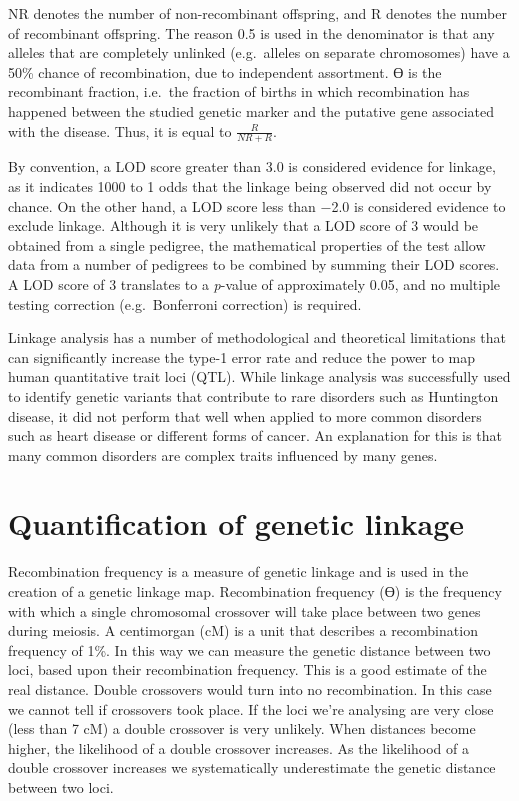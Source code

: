 NR denotes the number of non-recombinant offspring, and R denotes the number of recombinant offspring. The reason 0.5 is used in the denominator is that any alleles that are completely unlinked (e.g.~alleles on separate chromosomes) have a 50\% chance of recombination, due to independent assortment. ϴ is the recombinant fraction, i.e.~the fraction of births in which recombination has happened between the studied genetic marker and the putative gene associated with the disease. Thus, it is equal to \(\frac{R}{NR+R}\).

By convention, a LOD score greater than 3.0 is considered evidence for linkage, as it indicates 1000 to 1 odds that the linkage being observed did not occur by chance. On the other hand, a LOD score less than −2.0 is considered evidence to exclude linkage. Although it is very unlikely that a LOD score of 3 would be obtained from a single pedigree, the mathematical properties of the test allow data from a number of pedigrees to be combined by summing their LOD scores. A LOD score of 3 translates to a \emph{p}-value of approximately 0.05, and no multiple testing correction (e.g.~Bonferroni correction) is required.

Linkage analysis has a number of methodological and theoretical limitations that can significantly increase the type-1 error rate and reduce the power to map human quantitative trait loci (QTL). While linkage analysis was successfully used to identify genetic variants that contribute to rare disorders such as Huntington disease, it did not perform that well when applied to more common disorders such as heart disease or different forms of cancer. An explanation for this is that many common disorders are complex traits influenced by many genes.

\hypertarget{quantification-of-genetic-linkage}{%
\section{Quantification of genetic linkage}\label{quantification-of-genetic-linkage}}

Recombination frequency is a measure of genetic linkage and is used in the creation of a genetic linkage map. Recombination frequency (ϴ) is the frequency with which a single chromosomal crossover will take place between two genes during meiosis. A centimorgan (cM) is a unit that describes a recombination frequency of 1\%. In this way we can measure the genetic distance between two loci, based upon their recombination frequency. This is a good estimate of the real distance. Double crossovers would turn into no recombination. In this case we cannot tell if crossovers took place. If the loci we're analysing are very close (less than 7 cM) a double crossover is very unlikely. When distances become higher, the likelihood of a double crossover increases. As the likelihood of a double crossover increases we systematically underestimate the genetic distance between two loci.

